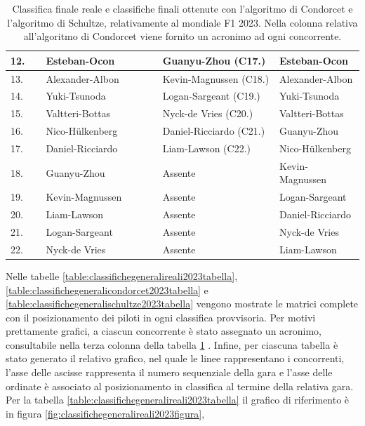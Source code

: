 \documentclass[12pt,a4paper,openright,twoside]{book}
\begin{document}
\begin{table}[H]
{\begin{tabular}{|p{0.1\linewidth}|p{0.33\linewidth}|p{0.33\linewidth}|p{0.33\linewidth}|}
    12.	 & 	Esteban-Ocon & 	 Guanyu-Zhou (C17.) & 	 Esteban-Ocon 	 \\ \hline
    13.	 & 	Alexander-Albon & 	 Kevin-Magnussen (C18.) & 	 Alexander-Albon 	 \\ \hline
    14.	 & 	Yuki-Tsunoda & 	 Logan-Sargeant (C19.) & 	 Yuki-Tsunoda 	 \\ \hline
    15.	 & 	Valtteri-Bottas & 	 Nyck-de Vries (C20.)& 	 Valtteri-Bottas 	 \\ \hline
    16.	 & 	Nico-Hülkenberg & 	 Daniel-Ricciardo (C21.)& 	 Guanyu-Zhou 	 \\ \hline
    17.	 & 	Daniel-Ricciardo & 	 Liam-Lawson (C22.) &	 Nico-Hülkenberg 	 \\ \hline
    18.	 & 	Guanyu-Zhou & 	 Assente &	 Kevin-Magnussen 	 \\ \hline
    19.	 & 	Kevin-Magnussen & 	 Assente &	 Logan-Sargeant 	 \\ \hline
    20.	 & 	Liam-Lawson & 	 Assente &	 Daniel-Ricciardo 	 \\ \hline
    21.	 & 	Logan-Sargeant & 	 Assente &	 Nyck-de Vries 	 \\ \hline
    22.	 & 	Nyck-de Vries & 	 Assente &	 Liam-Lawson 	 \\ \hline
    
    

    \end{tabular}}
    \endgroup

    \caption{Classifica finale reale e classifiche finali ottenute con 
    l'algoritmo di Condorcet e l'algoritmo di Schultze, relativamente al mondiale F1 2023.
    Nella colonna relativa all'algoritmo di Condorcet viene fornito un acronimo ad ogni concorrente. }
    \label{table:classifichefinali2023}
\end{table}
Nelle tabelle \ref{table:classifichegeneralireali2023tabella}, \ref{table:classifichegeneralicondorcet2023tabella} e \ref{table:classifichegeneralischultze2023tabella}
vengono mostrate le matrici complete con il posizionamento dei piloti in ogni classifica provvisoria.
Per motivi prettamente grafici, a ciascun concorrente è stato assegnato un acronimo, consultabile nella terza colonna della tabella \ref{table:classifichefinali2023} .
Infine, per ciascuna tabella è stato generato il relativo grafico, nel quale le linee rappresentano i concorrenti,
l'asse delle ascisse rappresenta il numero sequenziale della gara e l'asse delle ordinate è associato al posizionamento in classifica
al termine della relativa gara.
Per la tabella \ref{table:classifichegeneralireali2023tabella} il grafico di riferimento è in figura \ref{fig:classifichegeneralireali2023figura},
\end{document}
